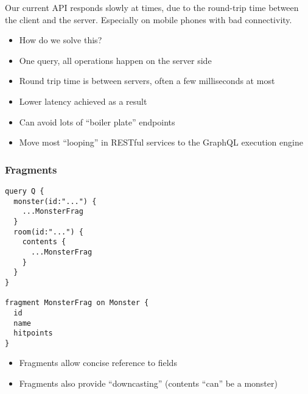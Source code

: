\documentclass[lualatex]{beamer}
\begin{document}
\begin{frame}
  Our current API responds slowly at times, due to the round-trip
  time between the client and the server. Especially on mobile phones
  with bad connectivity.
  
  \begin{itemize}
  \item How do we solve this?
  \end{itemize}
\end{frame}

\begin{frame}
  \begin{itemize}
  \item One query, all operations happen on the server side
  \item Round trip time is between servers, often a few milliseconds
    at most
  \item Lower latency achieved as a result
  \item Can avoid lots of ``boiler plate'' endpoints
  \item Move most ``looping'' in RESTful services to the GraphQL
    execution engine
  \end{itemize}
\end{frame}

\begin{frame}[fragile]
  \frametitle{Fragments}
\begin{verbatim}
query Q {
  monster(id:"...") {
    ...MonsterFrag
  }
  room(id:"...") {
    contents {
      ...MonsterFrag
    }
  }
}

fragment MonsterFrag on Monster {
  id
  name
  hitpoints
}
\end{verbatim}
\begin{itemize}
\item Fragments allow concise reference to fields
\item Fragments also provide ``downcasting'' (contents ``can'' be a
  monster)
\end{itemize}
\end{frame}
\end{document}
